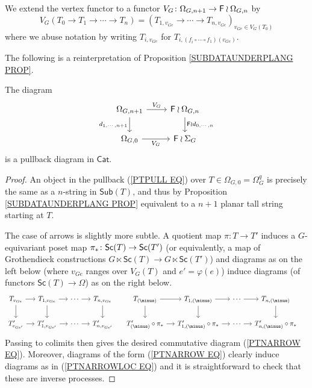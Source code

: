 \documentclass[a4paper,10pt]{article}%
\begin{document}
\begin{notation}
We extend the vertex functor to a functor 
$V_G \colon \Omega_{G,n+1} \to \mathsf{F} \wr \Omega_{G,n}$
by
\begin{equation}\label{VG DEF}
	V_G(T_0 \to T_1 \to \cdots \to T_n) = 
	(T_{1,v_{Ge}} \to \cdots \to
	T_{n,v_{Ge}})_{v_{Ge} \in V_G(T_0)}	
\end{equation}
where we abuse notation by writing $T_{i,v_{Ge}}$
for $T_{i, (f_i\circ \cdots \circ f_1)(v_{Ge})}$.
\end{notation}


The following is a reinterpretation of Proposition \ref{SUBDATAUNDERPLANG PROP}.

\begin{proposition} \label{SUBSASPULL PROP}
The diagram
	\begin{equation}\label{PTPULL EQ}
	\begin{tikzcd}
		\Omega_{G,n+1} \ar{r}{V_G} 
		\ar{d}[swap]{d_{1,\cdots,n+1}} & \Fin \wr \Omega_{G,n} 
		\ar{d}{\Fin \wr d_{0,\cdots,n}}
	\\
		\Omega_{G,0} \ar{r}[swap]{V_G} & \Fin \wr \Sigma_G
	\end{tikzcd}
	\end{equation}
is a pullback diagram in $\mathsf{Cat}$.
\end{proposition}


\begin{proof}
	An object in the pullback (\ref{PTPULL EQ}) over 
	$T\in \Omega_{G,0} = \Omega_G^q$ is precisely the same as a $n$-string in $\mathsf{Sub}(T)$, and thus by Proposition \ref{SUBDATAUNDERPLANG PROP} equivalent to a $n+1$ planar tall string starting at $T$.
	
	The case of arrows is slightly more subtle. A quotient map $\pi \colon T \to T'$ induces a $G$-equivariant poset map 
	$\pi_{\**} \colon \mathsf{Sc}(T) \to \mathsf{Sc}(T')$ 
	(or equivalently, a map of Grothendieck constructions 
	$G \ltimes \mathsf{Sc}(T) \to G \ltimes \mathsf{Sc}(T')$)
	and diagrams as on the left below (where $v_{Ge}$ ranges over $V_G(T)$ and $e'=\varphi(e)$) induce diagrams (of functors $\mathsf{Sc}(T) \to \Omega$) as on the right below.
	\begin{equation} \label{PTNARROWLOC EQ}
	\begin{tikzcd}[column sep=1.2em]
	T_{v_{G e}} \ar{r}{} \ar{d}[swap]{} & 
	T_{1,v_{G e}} \ar{r}{} \ar{d}[swap]{} &
	\cdots \ar{r}{} &
	T_{n,v_{G e}} \ar{d}{} &
	T_{(\minus)} \ar{r}{} \ar{d}[swap]{} & 
	T_{1,(\minus)} \ar{r}{} \ar{d}[swap]{} &
	\cdots \ar{r}{} &
	T_{n,(\minus)} \ar{d}{} &
\\
	T'_{v_{G e'}} \ar{r}{} &
	T'_{1,v_{G e'}} \ar{r}{} &
	\cdots \ar{r}{} &
	T'_{n,v_{G e'}} &
	T'_{(\minus)}\circ \pi_{\**} \ar{r}{} &
	T'_{1,(\minus)}\circ \pi_{\**} \ar{r}{} &
	\cdots \ar{r}{} &
	T'_{n,(\minus)}\circ \pi_{\**} &
	\end{tikzcd}	
	\end{equation}
Passing to colimits then gives the desired commutative diagram (\ref{PTNARROW EQ}). Moreover, diagrams of the form (\ref{PTNARROW EQ}) clearly induce diagrams as in  (\ref{PTNARROWLOC EQ}) and it is straightforward to check that these are inverse processes. 
\end{proof}
\end{document}
